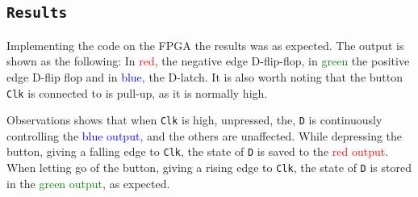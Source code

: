 \documentclass{article}
\let\oldsubsection\subsection
\renewcommand{\subsection}[1]{%
  \oldsubsection{\texttt{#1}}%
  \setcounter{subsubsection}{-1}%
}
\begin{document}
\subsection{Results}
Implementing the code on the FPGA the results was as expected. The output is shown as the following: In \textcolor{red}{red}, the negative edge D-flip-flop, in \textcolor{green}{green} the positive edge D-flip flop and in \textcolor{blue}{blue}, the D-latch. It is also worth noting that the button \verb|Clk| is connected to is pull-up, as it is normally high.\par
Observations shows that when \verb|Clk| is high, unpressed, the, \verb|D| is continuously controlling the \textcolor{blue}{blue output}, and the others are unaffected. While depressing the button, giving a falling edge to \verb|Clk|, the state of \verb|D| is saved to the \textcolor{red}{red output}. When letting go of the button, giving a rising edge to \verb|Clk|, the state of \verb|D| is stored in the \textcolor{green}{green output}, as expected.
\end{document}
